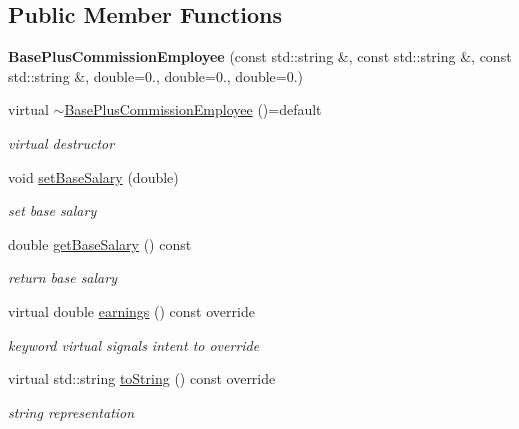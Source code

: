 \subsection*{Public Member Functions}
\begin{DoxyCompactItemize}
\item 
\mbox{\label{class_base_plus_commission_employee_a5648553e7a5a8337ae6cd6d0c5660e8a}} 
{\bfseries Base\+Plus\+Commission\+Employee} (const std\+::string \&, const std\+::string \&, const std\+::string \&, double=0., double=0., double=0.)
\item 
\mbox{\label{class_base_plus_commission_employee_a251fb6a98d7d9f427456fba0d0eaeeb1}} 
virtual \mbox{\hyperlink{class_base_plus_commission_employee_a251fb6a98d7d9f427456fba0d0eaeeb1}{$\sim$\+Base\+Plus\+Commission\+Employee}} ()=default
\begin{DoxyCompactList}\small\item\em virtual destructor \end{DoxyCompactList}\item 
\mbox{\label{class_base_plus_commission_employee_aa66aca9c0d08a445942bbe4d9207c170}} 
void \mbox{\hyperlink{class_base_plus_commission_employee_aa66aca9c0d08a445942bbe4d9207c170}{set\+Base\+Salary}} (double)
\begin{DoxyCompactList}\small\item\em set base salary \end{DoxyCompactList}\item 
\mbox{\label{class_base_plus_commission_employee_a836f52adf74e6561b746a4330cb34c44}} 
double \mbox{\hyperlink{class_base_plus_commission_employee_a836f52adf74e6561b746a4330cb34c44}{get\+Base\+Salary}} () const
\begin{DoxyCompactList}\small\item\em return base salary \end{DoxyCompactList}\item 
virtual double \mbox{\hyperlink{class_base_plus_commission_employee_a79cefc4722f05de0e545c2f911e2dcab}{earnings}} () const override
\begin{DoxyCompactList}\small\item\em keyword virtual signals intent to override \end{DoxyCompactList}\item 
\mbox{\label{class_base_plus_commission_employee_a3e13b88007de250004e95864999cb591}} 
virtual std\+::string \mbox{\hyperlink{class_base_plus_commission_employee_a3e13b88007de250004e95864999cb591}{to\+String}} () const override
\begin{DoxyCompactList}\small\item\em string representation \end{DoxyCompactList}\end{DoxyCompactItemize}


